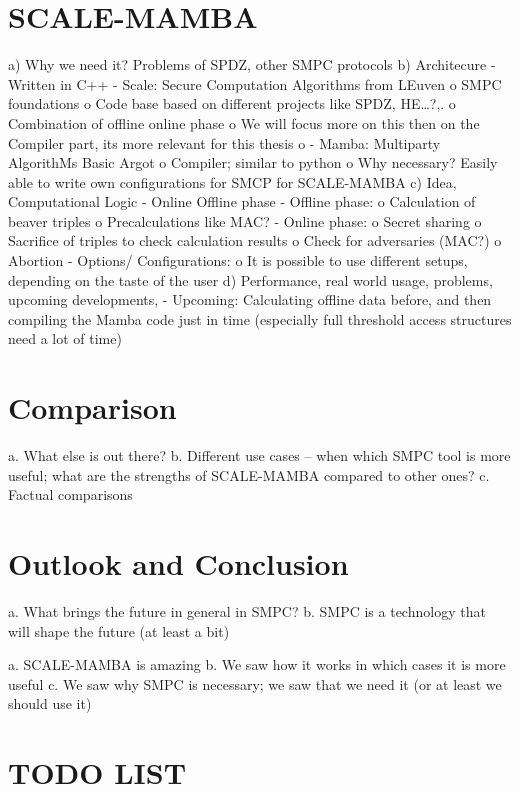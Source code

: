 \documentclass[english,runningheads,a4paper]{llncs}[2018/03/10]
\begin{document}
\section{SCALE-MAMBA}\label{sec:scalemamba}

a)	Why we need it? Problems of SPDZ, other SMPC protocols
b)	Architecure
-	Written in C++
-	Scale: Secure Computation Algorithms from LEuven
o	SMPC foundations
o	Code base based on different projects like SPDZ, HE…?,.
o	Combination of offline  online phase
o	We will focus more on this then on the Compiler part, its more relevant for this thesis
o	
-	Mamba: Multiparty AlgorithMs Basic Argot
o	Compiler; similar to python
o	Why necessary? Easily able to write own configurations for SMCP for SCALE-MAMBA
c)	Idea, Computational Logic
-	Online  Offline phase
-	Offline phase:
o	Calculation of beaver triples
o	Precalculations like MAC?
-	Online phase:
o	Secret sharing
o	Sacrifice of triples to check calculation results
o	Check for adversaries (MAC?)
o	Abortion
-	Options/ Configurations:
o	It is possible to use different setups, depending on the taste of the user
d)	Performance, real world usage, problems, upcoming developments, 
-	Upcoming: Calculating offline data before, and then compiling the Mamba code just in time (especially full threshold access structures need a lot of time)




\section{Comparison}\label{sec:comparison}


a.	What else is out there?
b.	Different use cases – when which SMPC tool is more useful; what are the strengths of SCALE-MAMBA compared to other ones?
c.	Factual comparisons


\section{Outlook and Conclusion}\label{sec:outlook}

a.	What brings the future in general in SMPC?
b.	SMPC is a technology that will shape the future (at least a bit)


a.	SCALE-MAMBA is amazing
b.	We saw how it works in which cases it is more useful
c.	We saw why SMPC is necessary; we saw that we need it (or at least we should use it)



\section{TODO LIST}\label{sec:xxx}
\end{document}
